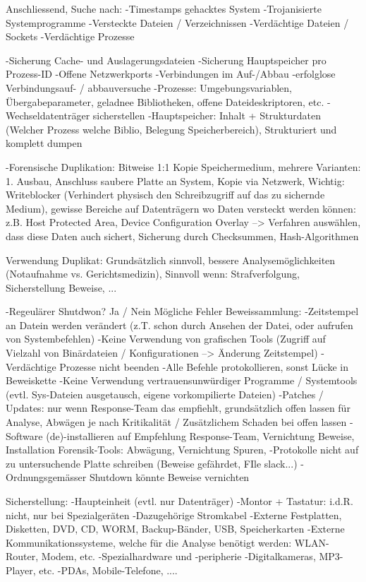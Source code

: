 Anschliessend, Suche nach:
-Timestamps gehacktes System
-Trojanisierte Systemprogramme
-Versteckte Dateien / Verzeichnissen
-Verdächtige Dateien / Sockets
-Verdächtige Prozesse

-Sicherung Cache- und Auslagerungsdateien
-Sicherung Hauptspeicher pro Prozess-ID
-Offene Netzwerkports
-Verbindungen im Auf-/Abbau
-erfolglose Verbindungsauf- / abbauversuche
-Prozesse: Umgebungsvariablen, Übergabeparameter, geladnee Bibliotheken, offene Dateideskriptoren, etc.
-Wechseldatenträger sicherstellen
-Hauptspeicher: Inhalt + Strukturdaten (Welcher Prozess welche Biblio, Belegung Speicherbereich), Strukturiert und komplett dumpen

-Forensische Duplikation: Bitweise 1:1 Kopie Speichermedium, mehrere Varianten: 1. Ausbau, Anschluss saubere Platte an System, Kopie via Netzwerk, Wichtig: Writeblocker (Verhindert physisch den Schreibzugriff auf das zu sichernde Medium), gewisse Bereiche auf Datenträgern wo Daten versteckt werden können: z.B. Host Protected Area, Device Configuration Overlay --> Verfahren auswählen, dass diese Daten auch sichert, Sicherung durch Checksummen, Hash-Algorithmen

Verwendung Duplikat: Grundsätzlich sinnvoll, bessere Analysemöglichkeiten (Notaufnahme vs. Gerichtsmedizin), Sinnvoll wenn: Strafverfolgung, Sicherstellung Beweise, ...

-Regeulärer Shutdwon? Ja / Nein
Mögliche Fehler Beweissammlung:
-Zeitstempel an Datein werden verändert (z.T. schon durch Ansehen der Datei, oder aufrufen von Systembefehlen)
-Keine Verwendung von grafischen Tools (Zugriff auf Vielzahl von Binärdateien / Konfigurationen --> Änderung Zeitstempel)
-Verdächtige Prozesse nicht beenden
-Alle Befehle protokollieren, sonst Lücke in Beweiskette
-Keine Verwendung vertrauensunwürdiger Programme / Systemtools (evtl. Sys-Dateien ausgetausch, eigene vorkompilierte Dateien)
-Patches / Updates: nur wenn Response-Team das empfiehlt, grundsätzlich offen lassen für Analyse, Abwägen je nach Kritikalität / Zusätzlichem Schaden bei offen lassen
-Software (de)-installieren auf Empfehlung Response-Team, Vernichtung Beweise, Installation Forensik-Tools: Abwägung, Vernichtung Spuren, 
-Protokolle nicht auf zu untersuchende Platte schreiben (Beweise gefährdet, FIle slack...)
-Ordnungsgemässer Shutdown könnte Beweise vernichten 


Sicherstellung:
-Haupteinheit (evtl. nur Datenträger)
-Montor + Tastatur: i.d.R. nicht, nur bei Spezialgeräten
-Dazugehörige Stromkabel
-Externe Festplatten, Disketten, DVD, CD, WORM, Backup-Bänder, USB, Speicherkarten
-Externe Kommunikationssysteme, welche für die Analyse benötigt werden: WLAN-Router, Modem, etc.
-Spezialhardware und -peripherie
-Digitalkameras, MP3-Player, etc.
-PDAs, Mobile-Telefone, ....

